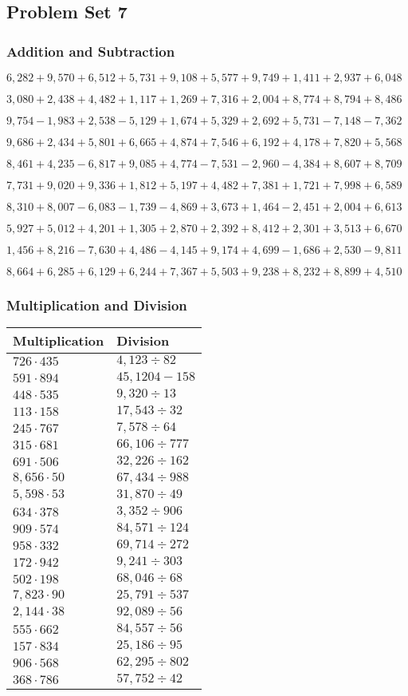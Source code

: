 \hypertarget{problem-set-7-3}{%
\subsection{Problem Set 7}\label{problem-set-7-3}}

\hypertarget{addition-and-subtraction-169}{%
\subsubsection{Addition and
Subtraction}\label{addition-and-subtraction-169}}

\(6,282+9,570+6,512+5,731+9,108+5,577+9,749+1,411+2,937+ 6,048\)

\(3,080+2,438+4,482+1,117+1,269+7,316+2,004+8,774+8,794+8,486\)

\(9,754-1,983+2,538-5,129+1,674+5,329+2,692+5,731-7,148-7,362\)

\(9,686+2,434+5,801+6,665+4,874+7,546+6,192+4,178+7,820+5,568\)

\(8,461+4,235-6,817+9,085+4,774-7,531-2,960-4,384+8,607+8,709\)

\(7,731+9,020+9,336+1,812+5,197+4,482+7,381+1,721+7,998+6,589\)

\(8,310+8,007-6,083-1,739-4,869+3,673+1,464-2,451+2,004+6,613\)

\(5,927+5,012+4,201+1,305+2,870+2,392+8,412+2,301+3,513+6,670\)

\(1,456+8,216-7,630+4,486-4,145+9,174+4,699-1,686+2,530-9,811\)

\(8,664+6,285+6,129+6,244+7,367+5,503+9,238+8,232+8,899+4,510\)

\hypertarget{multiplication-and-division-168}{%
\subsubsection{Multiplication and
Division}\label{multiplication-and-division-168}}

\begin{longtable}[]{@{}ll@{}}
\toprule
Multiplication & Division\tabularnewline
\midrule
\endhead
\(726\cdot435\) & \(4,123÷82\)\tabularnewline
\(591\cdot894\) & \(45,120 4-158\)\tabularnewline
\(448\cdot535\) & \(9,320÷13\)\tabularnewline
\(113\cdot158\) & \(17,543÷32\)\tabularnewline
\(245\cdot767\) & \(7,578÷64\)\tabularnewline
\(315\cdot681\) & \(66,106÷777\)\tabularnewline
\(691\cdot506\) & \(32,226÷162\)\tabularnewline
\(8,656\cdot50\) & \(67,434÷988\)\tabularnewline
\(5,598\cdot53\) & \(31,870÷49\)\tabularnewline
\(634\cdot378\) & \(3,352÷906\)\tabularnewline
\(909\cdot574\) & \(84,571÷124\)\tabularnewline
\(958\cdot332\) & \(69,714÷272\)\tabularnewline
\(172\cdot942\) & \(9,241÷303\)\tabularnewline
\(502\cdot198\) & \(68,046÷68\)\tabularnewline
\(7,823\cdot90\) & \(25,791÷537\)\tabularnewline
\(2,144\cdot38\) & \(92,089÷56\)\tabularnewline
\(555\cdot662\) & \(84,557÷56\)\tabularnewline
\(157\cdot834\) & \(25,186÷95\)\tabularnewline
\(906\cdot568\) & \(62,295÷802\)\tabularnewline
\(368\cdot786\) & \(57,752÷42\)\tabularnewline
\bottomrule
\end{longtable}

